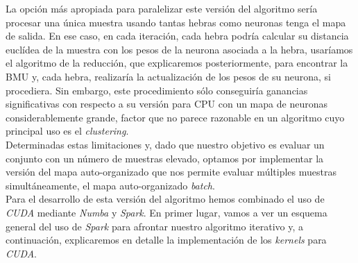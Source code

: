 La opción más apropiada para paralelizar este versión del algoritmo sería procesar una única muestra usando tantas hebras como neuronas tenga el mapa de salida. En ese caso, en cada iteración, cada hebra podría calcular su distancia euclídea de la muestra con los pesos de la neurona asociada a la hebra, usaríamos el algoritmo de la reducción, que explicaremos posteriormente, para encontrar la BMU y, cada hebra, realizaría la actualización de los pesos de su neurona, si procediera. Sin embargo, este procedimiento sólo conseguiría ganancias significativas con respecto a su versión para CPU con un mapa de neuronas considerablemente grande, factor que no parece razonable en un algoritmo cuyo principal uso es el \textit{clustering}.\\

Determinadas estas limitaciones y, dado que nuestro objetivo es evaluar un conjunto con un número de muestras elevado, optamos por implementar la versión del mapa auto-organizado que nos permite evaluar múltiples muestras simultáneamente, el mapa auto-organizado \textit{batch}.\\


Para el desarrollo de esta versión del algoritmo hemos combinado el uso de \textit{CUDA} mediante \textit{Numba} y \textit{Spark}. En primer lugar, vamos a ver un esquema general del uso de \textit{Spark} para afrontar nuestro algoritmo iterativo y, a continuación, explicaremos en detalle la implementación de los \textit{kernels} para \textit{CUDA}.

